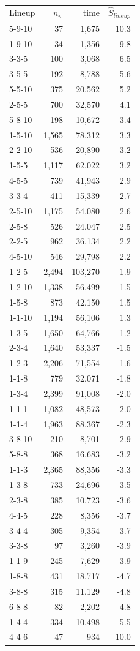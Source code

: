 \begin{tabular}{lrrr}
Lineup & $n_w$ & time & $\hat{S}_{lineup}$ \\
5-9-10 & 37 & 1,675 & 10.3 \\
1-9-10 & 34 & 1,356 & 9.8 \\
3-3-5 & 100 & 3,068 & 6.5 \\
3-5-5 & 192 & 8,788 & 5.6 \\
5-5-10 & 375 & 20,562 & 5.2 \\
2-5-5 & 700 & 32,570 & 4.1 \\
5-8-10 & 198 & 10,672 & 3.4 \\
1-5-10 & 1,565 & 78,312 & 3.3 \\
2-2-10 & 536 & 20,890 & 3.2 \\
1-5-5 & 1,117 & 62,022 & 3.2 \\
4-5-5 & 739 & 41,943 & 2.9 \\
3-3-4 & 411 & 15,339 & 2.7 \\
2-5-10 & 1,175 & 54,080 & 2.6 \\
2-5-8 & 526 & 24,047 & 2.5 \\
2-2-5 & 962 & 36,134 & 2.2 \\
4-5-10 & 546 & 29,798 & 2.2 \\
1-2-5 & 2,494 & 103,270 & 1.9 \\
1-2-10 & 1,338 & 56,499 & 1.5 \\
1-5-8 & 873 & 42,150 & 1.5 \\
1-1-10 & 1,194 & 56,106 & 1.3 \\
1-3-5 & 1,650 & 64,766 & 1.2 \\
2-3-4 & 1,640 & 53,337 & -1.5 \\
1-2-3 & 2,206 & 71,554 & -1.6 \\
1-1-8 & 779 & 32,071 & -1.8 \\
1-3-4 & 2,399 & 91,008 & -2.0 \\
1-1-1 & 1,082 & 48,573 & -2.0 \\
1-1-4 & 1,963 & 88,367 & -2.3 \\
3-8-10 & 210 & 8,701 & -2.9 \\
5-8-8 & 368 & 16,683 & -3.2 \\
1-1-3 & 2,365 & 88,356 & -3.3 \\
1-3-8 & 733 & 24,696 & -3.5 \\
2-3-8 & 385 & 10,723 & -3.6 \\
4-4-5 & 228 & 8,356 & -3.7 \\
3-4-4 & 305 & 9,354 & -3.7 \\
3-3-8 & 97 & 3,260 & -3.9 \\
1-1-9 & 245 & 7,629 & -3.9 \\
1-8-8 & 431 & 18,717 & -4.7 \\
3-8-8 & 315 & 11,129 & -4.8 \\
6-8-8 & 82 & 2,202 & -4.8 \\
1-4-4 & 334 & 10,498 & -5.5 \\
4-4-6 & 47 & 934 & -10.0 \\
\end{tabular}
